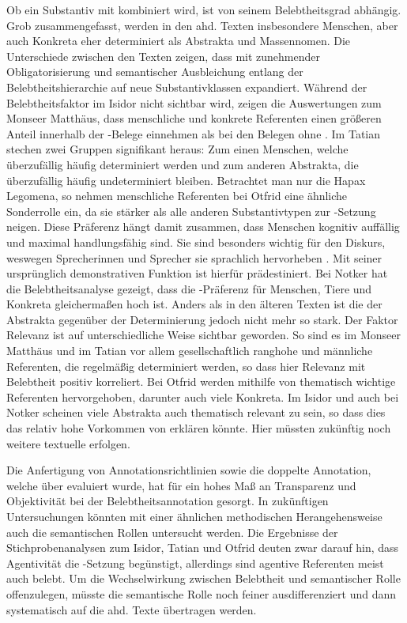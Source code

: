 Ob ein Substantiv mit  kombiniert wird, ist von seinem Belebtheitsgrad abhängig. Grob zusammengefasst, werden in den ahd. Texten insbesondere Menschen, aber auch Konkreta eher determiniert als Abstrakta und Massennomen. Die Unterschiede zwischen den Texten zeigen, dass  mit zunehmender Obligatorisierung und semantischer Ausbleichung entlang der Belebtheitshierarchie auf neue Substantivklassen expandiert. Während der Belebtheitsfaktor im Isidor nicht sichtbar wird, zeigen die Auswertungen zum Monseer Matthäus, dass menschliche und konkrete Referenten einen größeren Anteil innerhalb der -Belege einnehmen als bei den Belegen ohne . Im Tatian stechen zwei Gruppen signifikant heraus: Zum einen Menschen, welche überzufällig häufig determiniert werden und zum anderen Abstrakta, die überzufällig häufig undeterminiert bleiben. Betrachtet man nur die Hapax Legomena, so nehmen menschliche Referenten bei Otfrid eine ähnliche Sonderrolle ein, da sie stärker als alle anderen Substantivtypen zur -Setzung neigen. Diese Präferenz hängt damit zusammen, dass Menschen kognitiv auffällig und maximal handlungsfähig sind. Sie sind besonders wichtig für den Diskurs, weswegen Sprecherinnen und Sprecher sie sprachlich hervorheben . Mit seiner ursprünglich demonstrativen Funktion ist  hierfür prädestiniert.  
Bei Notker hat die Belebtheitsanalyse gezeigt, dass die  -Präferenz für Menschen, Tiere und Konkreta gleichermaßen hoch ist. Anders als in den älteren Texten ist die  der Abstrakta gegenüber der Determinierung jedoch nicht mehr so stark. Der Faktor Relevanz ist auf unterschiedliche Weise sichtbar geworden. So sind es im Monseer Matthäus und im Tatian vor allem gesellschaftlich ranghohe und männliche Referenten, die regelmäßig determiniert werden, so dass hier Relevanz mit Belebtheit positiv korreliert. Bei Otfrid werden mithilfe von  thematisch wichtige Referenten hervorgehoben, darunter auch viele Konkreta. Im Isidor und auch bei Notker scheinen viele Abstrakta auch thematisch relevant zu sein, so dass dies das relativ hohe Vorkommen von  erklären könnte. Hier müssten zukünftig noch weitere textuelle  erfolgen.

Die Anfertigung von Annotationsrichtlinien \parencite[dokumentiert in]{HZKYL4_2020} sowie die doppelte Annotation, welche über  evaluiert wurde, hat für ein hohes Maß an Transparenz und Objektivität bei der Belebtheitsannotation gesorgt. In zukünftigen Untersuchungen könnten mit einer ähnlichen methodischen Herangehensweise auch die semantischen Rollen untersucht werden. Die Ergebnisse der Stichprobenanalysen zum Isidor, Tatian und Otfrid deuten zwar darauf hin, dass Agentivität die -Setzung begünstigt, allerdings sind agentive Referenten meist auch belebt. Um die Wechselwirkung zwischen Belebtheit und semantischer Rolle offenzulegen, müsste die semantische Rolle noch feiner ausdifferenziert und dann systematisch auf die ahd. Texte übertragen werden. 

